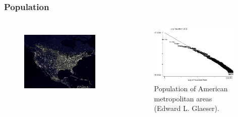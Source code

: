 \documentclass[notes]{beamer}
\begin{document}
\frame
{
  \frametitle{Population}

  \begin{columns}[c]
     \begin{figure}[h!]
     \centering
     \includegraphics[width=0.9\textwidth]{images/cities.jpg}
     \label{fig:cities}
     \end{figure}
     \begin{figure}[h!]
     \centering
     \includegraphics[width=0.95\textwidth]{images/glaeserzipf.jpg}
     \caption{Population of American metropolitan areas (Edward L. Glaeser).}
     \label{fig:glaeserzipf}
     \end{figure}
  \end{columns}
}
\end{document}

